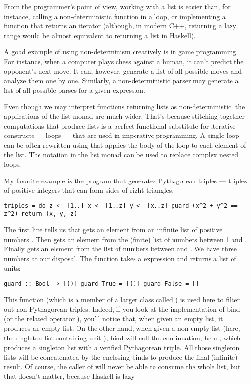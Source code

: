 From the programmer's point of view, working with a list is easier than,
for instance, calling a non-deterministic function in a loop, or
implementing a function that returns an iterator (although,
\href{http://ericniebler.com/2014/04/27/range-comprehensions/}{in modern
C++}, returning a lazy range would be almost equivalent to returning a
list in Haskell).

A good example of using non-determinism creatively is in game
programming. For instance, when a computer plays chess against a human,
it can't predict the opponent's next move. It can, however, generate a
list of all possible moves and analyze them one by one. Similarly, a
non-deterministic parser may generate a list of all possible parses for
a given expression.

Even though we may interpret functions returning lists as
non-deterministic, the applications of the list monad are much wider.
That's because stitching together computations that produce lists is a
perfect functional substitute for iterative constructs --- loops ---
that are used in imperative programming. A single loop can be often
rewritten using  that applies the body of the loop to each
element of the list. The  notation in the list monad can be
used to replace complex nested loops.

My favorite example is the program that generates Pythagorean triples
--- triples of positive integers that can form sides of right triangles.

\begin{verbatim}
triples = do z <- [1..] x <- [1..z] y <- [x..z] guard (x^2 + y^2 == z^2) return (x, y, z)
\end{verbatim}

The first line tells us that  gets an element from an infinite
list of positive numbers \code{{[}1..{]}}. Then  gets an
element from the (finite) list \code{{[}1..z{]}} of numbers between 1
and . Finally  gets an element from the list of
numbers between  and . We have three numbers
 at our
disposal. The function  takes a  expression
and returns a list of units:

\begin{verbatim}
guard :: Bool -> [()] guard True = [()] guard False = []
\end{verbatim}

This function (which is a member of a larger class called
) is used here to filter out non-Pythagorean triples.
Indeed, if you look at the implementation of bind (or the related
operator \code{>>}), you'll notice that,
when given an empty list, it produces an empty list. On the other hand,
when given a non-empty list (here, the singleton list containing unit
\code{{[}(){]}}), bind will call the continuation, here
, which produces a singleton list with a
verified Pythagorean triple. All those singleton lists will be
concatenated by the enclosing binds to produce the final (infinite)
result. Of course, the caller of  will never be able to
consume the whole list, but that doesn't matter, because Haskell is
lazy.

